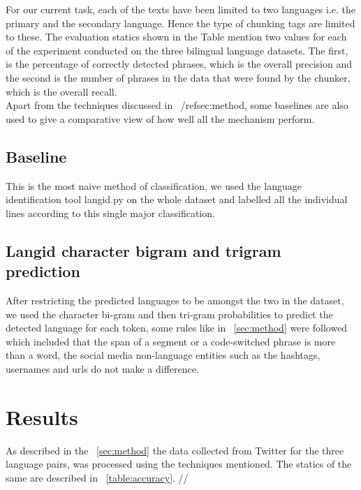 \documentclass[11pt]{article}
\begin{document}
For our current task, each of the texts have been limited to two languages i.e. the primary and the secondary language. Hence the type of chunking tags are limited to these. The evaluation statics shown in the Table mention two values for each of the experiment conducted on the three bilingual language datasets. The first, is the percentage of correctly detected phrases, which is the overall precision and the second is the number of phrases in the data that were found by the chunker, which is the overall recall. \\

Apart from the techniques discussed in ~/ref{sec:method}, some baselines are also used to give a comparative view of how well all the mechanism perform.

\subsection{Baseline}
\label{baseline}

 This is the most naive method of classification, we used the language identification tool langid.py \cite{lui2012langid} on the whole dataset and labelled all the individual lines according to this single major classification. \\

\subsection{Langid character bigram and trigram prediction}
\label{langidstuff}

After restricting the predicted languages to be amongst the two in the dataset, we used the character bi-gram and then tri-gram probabilities to predict the detected language for each token, some rules like in ~\ref{sec:method} were followed which included that the span of a segment or a code-switched phrase is more than a word, the social media non-language entities such as the hashtags, usernames and urls do not make a difference. \\



\section{Results}
\label{sec:results}
As described in the ~\ref{sec:method} the data collected from Twitter for the three language pairs, was processed using the techniques mentioned. The statics of the same are described in ~\ref{table:accuracy}. // 
\end{document}
